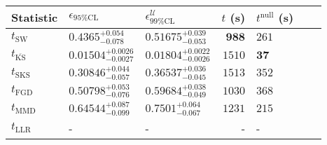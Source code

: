\begin{tabular}{l|llr|llr}
	Statistic & $\epsilon_{95\%\mathrm{CL}}$ & $\epsilon^    {\mathcal{U}}_{99\%\mathrm{CL}}$ & $t$ (s) & $t^{\mathrm{null}}$ (s) \\
	\midrule
	$t_{\mathrm{SW}}$ & $0.4365_{-0.078}^{+0.054}$ & $0.51675_{-0.053}^{+0.039}$ & ${\mathbf{988}}$ & $261$ \\
	$t_{\overline{\mathrm{KS}}}$ & ${\mathbf{0.01504_{-0.0027}^{+0.0026}}}$ & ${\mathbf{0.01804_{-0.0026}^{+0.0022}}}$ & $1510$ & ${\mathbf{37}}$ \\
	$t_{\mathrm{SKS}}$ & $0.30846_{-0.057}^{+0.044}$ & $0.36537_{-0.045}^{+0.036}$ & $1513$ & $352$ \\
	$t_{\mathrm{FGD}}$ & $0.50798_{-0.076}^{+0.053}$ & $0.59684_{-0.049}^{+0.038}$ & $1030$ & $368$ \\
	$t_{\mathrm{MMD}}$ & $0.64544_{-0.099}^{+0.087}$ & $0.7501_{-0.067}^{+0.064}$ & $1231$ & $215$ \\
	$t_{\mathrm{LLR}}$ & - & - & - & - \\
	\bottomrule
\end{tabular}